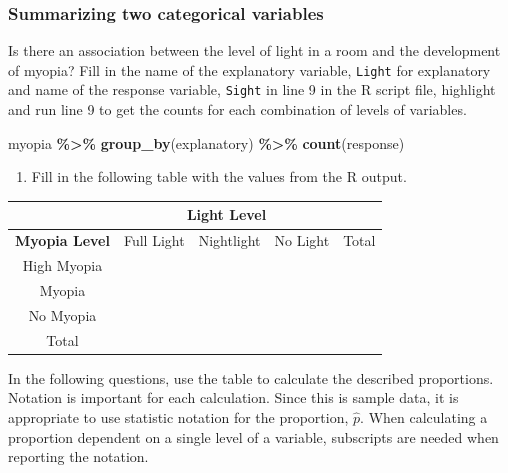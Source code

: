\documentclass[
]{report}
\newenvironment{Shaded}{\begin{snugshade}}{\end{snugshade}}
\newcommand{\FunctionTok}[1]{\textcolor[rgb]{0.13,0.29,0.53}{\textbf{#1}}}
\newcommand{\NormalTok}[1]{#1}
\newcommand{\SpecialCharTok}[1]{\textcolor[rgb]{0.81,0.36,0.00}{\textbf{#1}}}
\providecommand{\tightlist}{%
  \setlength{\itemsep}{0pt}\setlength{\parskip}{0pt}}
\begin{document}
\vspace{0.3in}

\subsubsection*{Summarizing two categorical variables}\label{summarizing-two-categorical-variables}

Is there an association between the level of light in a room and the development of myopia? Fill in the name of the explanatory variable, \texttt{Light} for explanatory and name of the response variable, \texttt{Sight} in line 9 in the R script file, highlight and run line 9 to get the counts for each combination of levels of variables.

\begin{Shaded}
\begin{Highlighting}[]
\NormalTok{myopia }\SpecialCharTok{\%\textgreater{}\%} \FunctionTok{group\_by}\NormalTok{(explanatory) }\SpecialCharTok{\%\textgreater{}\%} \FunctionTok{count}\NormalTok{(response)}
\end{Highlighting}
\end{Shaded}

\begin{enumerate}
\def\labelenumi{\arabic{enumi}.}
\setcounter{enumi}{2}
\tightlist
\item
  Fill in the following table with the values from the R output.
\end{enumerate}

\begin{center}
\begingroup
\setlength{\tabcolsep}{14pt} %
\renewcommand{\arraystretch}{2} %
\begin{tabular}{|c|c|c|c|c|}
\hline
 & \multicolumn{3}{|c|}{\textbf{Light Level}} & \\ \hline
\textbf{Myopia Level} & Full Light & Nightlight & No Light & Total \\ \hline
 High Myopia & & & & \\ \hline
 Myopia & & & & \\ \hline
 No Myopia & & & & \\ \hline
 Total & & & & \\ \hline  
\end{tabular}
\endgroup
\end{center}

In the following questions, use the table to calculate the described proportions. Notation is important for each calculation. Since this is sample data, it is appropriate to use statistic notation for the proportion, \(\hat{p}\). When calculating a proportion dependent on a single level of a variable, subscripts are needed when reporting the notation.
\end{document}
